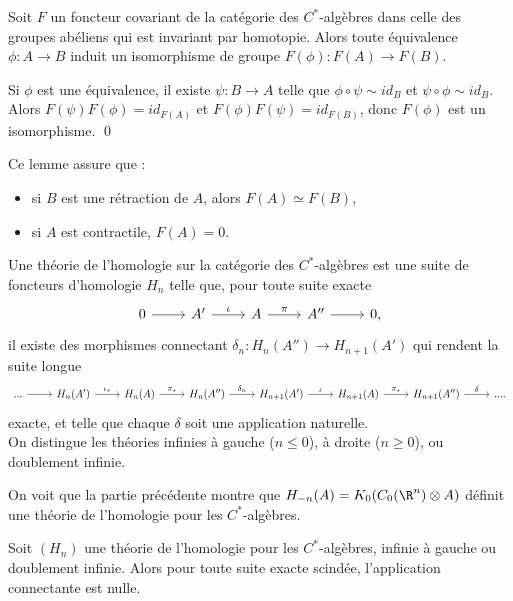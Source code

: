 \begin{prop}
Soit $F$ un foncteur covariant de la catégorie des $C^*$-algèbres dans celle des groupes abéliens qui est invariant par homotopie. Alors toute équivalence $\phi: A \rightarrow B$ induit un isomorphisme de groupe $F(\phi):F(A)\rightarrow F(B)$.
\end{prop}

\begin{dem} Si $\phi$ est une équivalence, il existe $\psi : B\rightarrow A $ telle que $\phi \circ \psi \sim id_B $ et $\psi\circ \phi\sim id_B$. Alors $F(\psi)F(\phi)=id_{F(A)}$ et $F(\phi)F(\psi)=id_{F(B)}$, donc $F(\phi)$ est un isomorphisme. \qed
\end{dem}

Ce lemme assure que :
\begin{itemize}
\item si $B$ est une rétraction de $A$, alors $F(A)\simeq F(B)$,
\item si $A$ est contractile, $F(A)=0$.
\end{itemize}

\begin{definition}
Une théorie de l'homologie sur la catégorie des $C^*$-algèbres est une suite de foncteurs d'homologie $H_n$ telle que, pour toute suite exacte 
\[\begin{tikzcd}
0\arrow{r} & A' \arrow{r}{\iota} & A \arrow{r}{\pi} & A'' \arrow{r} & 0,
\end{tikzcd}\]
il existe des morphismes connectant $\delta_n : H_n(A'')\rightarrow H_{n+1}(A')$ qui rendent la suite longue 
\[\begin{tikzcd}[row sep =small]
...\arrow{r} & H_n( A') \arrow{r}{\iota_*} & H_n(A) \arrow{r}{\pi_*} & H_n(A'') \arrow{r}{\delta_n} & H_{n+1}(A')\arrow{r}{\iota} & H_{n+1}(A) \arrow{r}{\pi_*} & H_{n+1}(A'')\arrow{r}{\delta}& ....
\end{tikzcd}\]
exacte, et telle que chaque $\delta$ soit une application naturelle. \\
On distingue les théories infinies à gauche ($n\leq 0$), à droite ($n\geq 0$), ou doublement infinie. 
\end{definition}

On voit que la partie précédente montre que $H_{-n}(A)=K_0(C_0(\R^n)\otimes A)$ définit une théorie de l'homologie pour les $C^*$-algèbres.\\

\begin{prop}
Soit $(H_n)$ une théorie de l'homologie pour les $C^*$-algèbres, infinie à gauche ou doublement infinie. Alors pour toute suite exacte scindée, l'application connectante est nulle. 
\end{prop}


